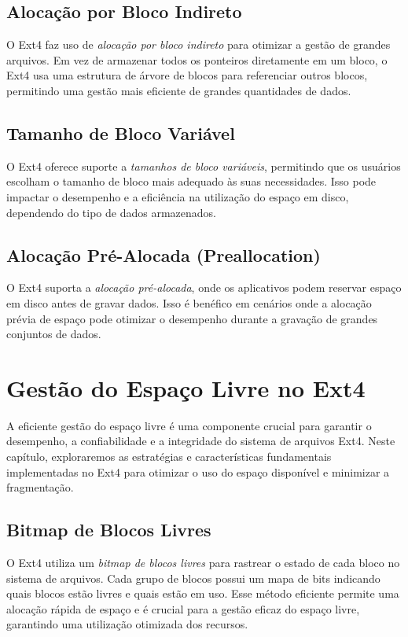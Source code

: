 \documentclass[
	12pt,				%
	openright,			%
	oneside,			%
	a4paper,			%
	chapter=TITLE,		%
	english,			%
	french,				%
	spanish,			%
	brazil				%
	]{abntex2}
\theoremstyle{definition}
\begin{document}
\section{Alocação por Bloco Indireto}
O Ext4 faz uso de \textit{alocação por bloco indireto} para otimizar a gestão de grandes arquivos. Em vez de armazenar todos os ponteiros diretamente em um bloco, o Ext4 usa uma estrutura de árvore de blocos para referenciar outros blocos, permitindo uma gestão mais eficiente de grandes quantidades de dados.

\section{Tamanho de Bloco Variável}
O Ext4 oferece suporte a \textit{tamanhos de bloco variáveis}, permitindo que os usuários escolham o tamanho de bloco mais adequado às suas necessidades. Isso pode impactar o desempenho e a eficiência na utilização do espaço em disco, dependendo do tipo de dados armazenados.

\section{Alocação Pré-Alocada (Preallocation)}
O Ext4 suporta a \textit{alocação pré-alocada}, onde os aplicativos podem reservar espaço em disco antes de gravar dados. Isso é benéfico em cenários onde a alocação prévia de espaço pode otimizar o desempenho durante a gravação de grandes conjuntos de dados.

\chapter{Gestão do Espaço Livre no Ext4}

A eficiente gestão do espaço livre é uma componente crucial para garantir o desempenho, a confiabilidade e a integridade do sistema de arquivos Ext4. Neste capítulo, exploraremos as estratégias e características fundamentais implementadas no Ext4 para otimizar o uso do espaço disponível e minimizar a fragmentação.

\section{Bitmap de Blocos Livres}

O Ext4 utiliza um \textit{bitmap de blocos livres} para rastrear o estado de cada bloco no sistema de arquivos. Cada grupo de blocos possui um mapa de bits indicando quais blocos estão livres e quais estão em uso. Esse método eficiente permite uma alocação rápida de espaço e é crucial para a gestão eficaz do espaço livre, garantindo uma utilização otimizada dos recursos.
\end{document}
